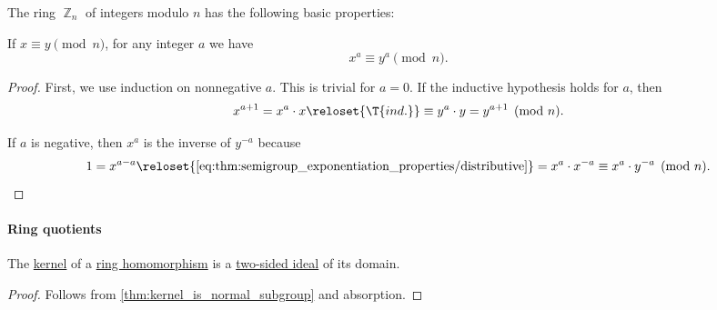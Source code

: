\begin{proposition}\label{thm:def:ring_of_integers_modulo}
  The ring \hyperref[def:ring_of_integers_modulo]{\( \BbbZ_n \)} of integers modulo \( n \) has the following basic properties:
  \begin{thmenum}
     If \( x \equiv y \pmod n \), for any integer \( a \) we have
    \begin{equation}\label{eq:thm:def:ring_of_integers_modulo/power_of_congruent}
      x^a \equiv y^a \pmod n.
    \end{equation}
  \end{thmenum}
\end{proposition}
\begin{proof}
   First, we use induction on nonnegative \( a \). This is trivial for \( a = 0 \). If the inductive hypothesis holds for \( a \), then
  \begin{equation*}
    x^{a+1}
    =
    x^a \cdot x
    \reloset {\T{ind.}} \equiv
    y^a \cdot y
    =
    y^{a+1}
    \pmod n.
  \end{equation*}

  If \( a \) is negative, then \( x^a \) is the inverse of \( y^{-a} \) because
  \begin{equation*}
    1
    =
    x^{a-a}
    \reloset {\eqref{eq:thm:semigroup_exponentiation_properties/distributive}} =
    x^a \cdot x^{-a}
    \equiv
    x^a \cdot y^{-a}
    \pmod n.
  \end{equation*}
\end{proof}

\paragraph{Ring quotients}

\begin{proposition}\label{thm:kernel_is_ring_ideal}
  The \hyperref[def:ring/kernel]{kernel} of a \hyperref[def:ring/morphism]{ring homomorphism} is a \hyperref[def:semiring_ideal]{two-sided ideal} of its domain.
\end{proposition}
\begin{proof}
  Follows from \cref{thm:kernel_is_normal_subgroup} and absorption.
\end{proof}

